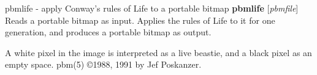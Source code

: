 %

\newpage
%

pbmlife - apply Conway's rules of Life to a portable bitmap
{\bf pbmlife}
{\rm [}{\it pbmfile}{\rm ]}
Reads a portable bitmap as input.
Applies the rules of Life to it for one generation,
and produces a portable bitmap as output.
\par
A white pixel in the image is interpreted as a live beastie, and a
black pixel as an empty space.
pbm(5)
\copyright 1988, 1991 by Jef Poskanzer.
%
 
%

\newpage
%

